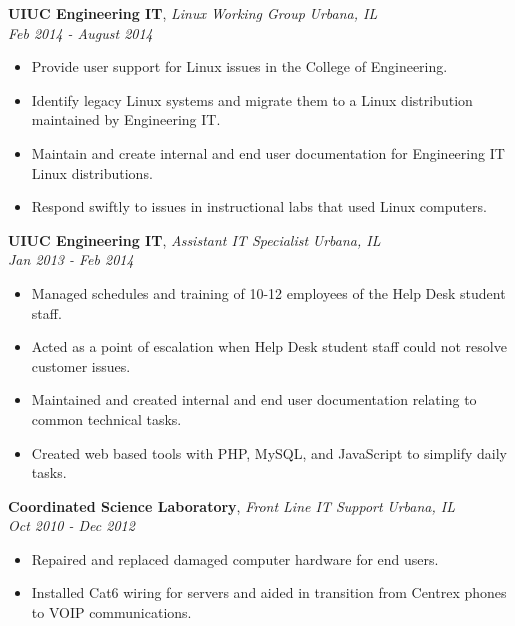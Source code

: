 \documentclass{article}
\newenvironment{changemargin}[2]{%
  \begin{list}{}{%
    \setlength{\topsep}{0pt}%
    \setlength{\leftmargin}{#1}%
    \setlength{\rightmargin}{#2}%
    \setlength{\listparindent}{\parindent}%
    \setlength{\itemindent}{\parindent}%
    \setlength{\parsep}{\parskip}%
  }%
  \item[]}{\end{list}
}
\newenvironment{body} {
	\vspace*{-16pt}
	\begin{changemargin}{-0.25in}{-0.5in}
  }	
	{\end{changemargin}
}
\begin{document}
\begin{body}
	\vspace{14pt}
	\textbf{UIUC Engineering IT}, \emph{Linux Working Group} \hfill \emph{Urbana, IL}\\
	\hfill \emph{Feb 2014 - August 2014}\\
	\vspace*{-16pt}
	\begin{itemize} \itemsep -0pt  %
		\item Provide user support for Linux issues in the College of Engineering.
		\item Identify legacy Linux systems and migrate them to a Linux distribution maintained by Engineering IT.
		\item Maintain and create internal and end user documentation for Engineering IT Linux distributions.
		\item Respond swiftly to issues in instructional labs that used Linux computers.
	\end{itemize}


	\vspace{14pt}
	\textbf{UIUC Engineering IT}, \emph{Assistant IT Specialist} \hfill \emph{Urbana, IL}\\
	\hfill \emph{Jan 2013 - Feb 2014}\\
	\vspace*{-16pt}
	\begin{itemize} \itemsep -0pt  %
		\item Managed schedules and training of 10-12 employees of the Help Desk student staff.
		\item Acted as a point of escalation when Help Desk student staff could not resolve customer issues.
		\item Maintained and created internal and end user documentation relating to common technical tasks.
		\item Created web based tools with PHP, MySQL, and JavaScript to simplify daily tasks.
	\end{itemize}
	
	\vspace{14pt}
	\textbf{Coordinated Science Laboratory}, \emph{Front Line IT Support} \hfill \emph{Urbana, IL}\\
	\hfill \emph{Oct 2010 - Dec 2012}\\
	\vspace*{-16pt}
	\begin{itemize} \itemsep -0pt  %
		\item Repaired and replaced damaged computer hardware for end users.
		\item Installed Cat6 wiring for servers and aided in transition from Centrex phones to VOIP communications.
	\end{itemize}

\end{body}
\end{document}
